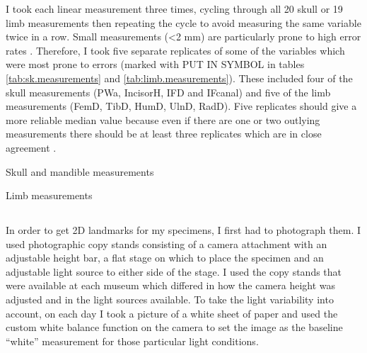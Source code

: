 	I took each linear measurement three times, cycling through all 20 skull or 19 limb measurements then repeating the cycle to avoid measuring the same variable twice in a row. Small measurements (<2 mm) are particularly prone to high error rates \citep{Cardini2008}. Therefore, I took five separate replicates of some of the variables which were most prone to errors (marked with PUT IN SYMBOL in tables \ref{tab:sk.measurements} and \ref{tab:limb.measurements}). These included four of the skull measurements (PWa, IncisorH, IFD and IFcanal) and five of the limb measurements (FemD, TibD, HumD, UlnD, RadD). 
	Five replicates should give a more reliable median value because even if there are one or two outlying measurements there should be at least three replicates which are in close agreement \citep{Cooper2009}.



\begin{table}[h]
	\caption[Skull and mandible measurements]
			{Skull and mandible measurements}%
	
	\label{tab:sk.measurements}
\end{table}


\begin{table}[h]
	\caption[Limb measurements]
		{Limb measurements} %
	
	\label{tab:limb.measurements}
\end{table}


\subsection{}

	In order to get 2D landmarks for my specimens, I first had to photograph them. I used photographic copy stands consisting of a camera attachment with an adjustable height bar, a flat stage on which to place the specimen and an adjustable light source to either side of the stage. I used the copy stands that were available at each museum which differed in how the camera height was adjusted and in the light sources available.
	To take the light variability into account, on each day I took a picture of a white sheet of paper and used the custom white balance function on the camera to set the image as the baseline “white” measurement for those particular light conditions.
	
